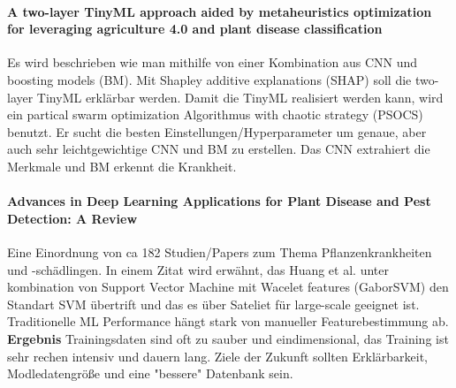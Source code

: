 \documentclass[a4paper, landscape]{article}
\begin{document}
\paragraph{A two-layer TinyML approach aided by metaheuristics optimization for leveraging agriculture 4.0 and plant disease classification}
\cite{} Es wird beschrieben wie man mithilfe von einer Kombination aus CNN und boosting models (BM). Mit Shapley additive explanations (SHAP) soll die two-layer TinyML erklärbar werden. Damit die TinyML realisiert werden kann, wird ein partical swarm optimization Algorithmus with chaotic strategy (PSOCS) benutzt. Er sucht die besten Einstellungen/Hyperparameter um genaue, aber auch sehr leichtgewichtige CNN und BM zu erstellen. Das CNN extrahiert die Merkmale und BM erkennt die Krankheit.

\paragraph{Advances in Deep Learning Applications for Plant Disease and Pest Detection: A Review}
\cite{} Eine Einordnung von ca 182 Studien/Papers zum Thema Pflanzenkrankheiten und -schädlingen.
In einem Zitat wird erwähnt, das Huang et al. unter kombination von Support Vector Machine mit Wacelet features (GaborSVM) den Standart SVM übertrift und das es über Sateliet für large-scale geeignet ist. Traditionelle ML Performance hängt stark von manueller Featurebestimmung ab. \textbf{Ergebnis} Trainingsdaten sind oft zu sauber und eindimensional, das Training ist sehr rechen intensiv und dauern lang. Ziele der Zukunft sollten Erklärbarkeit, Modledatengröße und eine "bessere" Datenbank sein.




\end{document}

